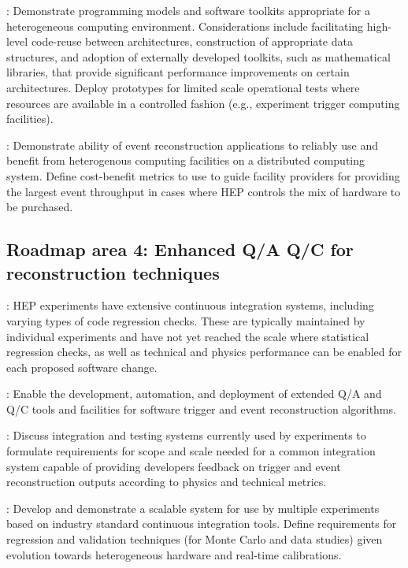 \vskip 0.5cm
: Demonstrate programming models and software toolkits appropriate for a heterogeneous computing environment. Considerations include facilitating high-level code-reuse between architectures, construction of appropriate data structures, and adoption of externally developed toolkits, such as mathematical libraries, that provide significant performance improvements on certain architectures. Deploy prototypes for limited scale operational tests where resources are available in a controlled fashion (e.g., experiment trigger computing facilities).

\vskip 0.5cm
: Demonstrate ability of event reconstruction applications to reliably use and benefit from heterogenous computing facilities on a distributed computing system. Define cost-benefit metrics to use to guide facility providers for providing the largest event throughput in cases where HEP controls the mix of hardware to be purchased.

\subsection{Roadmap area 4: Enhanced Q/A Q/C for reconstruction techniques}
: HEP experiments have extensive continuous integration systems, including varying types of code regression checks. These are typically maintained by individual experiments and have not yet reached the scale where statistical regression checks, as well as technical and physics performance can be enabled for each proposed software change.

\vskip 0.5cm
: Enable the development, automation, and deployment of extended Q/A and Q/C tools and facilities for software trigger and event reconstruction algorithms. 

\vskip 0.5cm
: Discuss integration and testing systems currently used by experiments to    formulate requirements for scope and scale needed for a common integration system capable of providing developers feedback on trigger and event reconstruction outputs according to physics and technical metrics.

\vskip 0.5cm
: Develop and demonstrate a scalable system for use by multiple experiments based on industry standard continuous integration tools. Define requirements for regression and validation techniques (for Monte Carlo and data studies) given evolution towards heterogeneous hardware and real-time calibrations.

